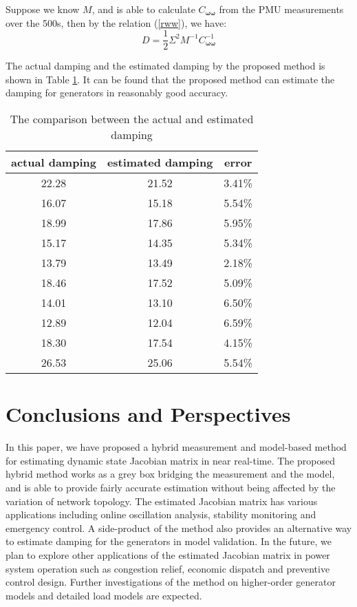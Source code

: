 \documentclass[journal]{IEEEtran}
\begin{document}
Suppose we know $M$, and is able to calculate $C_{\bm{\omega}{\bm{\omega}}}$ from the PMU measurements over the 500s, then by the relation (\ref{rww}), we have:
\begin{equation}
D=\frac{1}{2}\Sigma^2M^{-1}C_{\bm{\omega}{\bm{\omega}}}^{-1} \label{D}
\end{equation}

The actual damping and the estimated damping by the proposed method is shown in Table \ref{39-dampingtable}. It can be found that the proposed method can estimate the damping for generators in reasonably good accuracy.
\begin{table}[!ht]
\centering
\caption{The comparison between the actual and estimated damping}\label{39-dampingtable}
\begin{tabular}{|c|c|c|}
\hline
actual damping&estimated damping&error\\
\hline
22.28&21.52&3.41\%\\
\hline
16.07&15.18&5.54\%\\
\hline
18.99&17.86&5.95\%\\
\hline
15.17&14.35&5.34\%\\
\hline
13.79&13.49&2.18\%\\
\hline
18.46&17.52&5.09\%\\
\hline
14.01&13.10&6.50\%\\
\hline
12.89&12.04&6.59\%\\
\hline
18.30&17.54&4.15\%\\
\hline
26.53&25.06&5.54\%\\
\hline
\end{tabular}
\end{table}


\section{Conclusions and Perspectives}\label{sectionconclusion}

In this paper, we have proposed a hybrid measurement and model-based method for estimating dynamic state Jacobian matrix in near real-time. The proposed hybrid method works as a grey box bridging the measurement and the model, and is able to provide fairly accurate estimation without being affected by the variation of network topology. The estimated Jacobian matrix has various applications including online oscillation analysis, stability monitoring and emergency control. A side-product of the method also provides an alternative way to estimate damping for the generators in model validation. In the future, we plan to explore other applications of the estimated Jacobian matrix in power system operation such as congestion relief, economic dispatch and preventive control design. Further investigations of the method on higher-order generator models and detailed load models are expected. 
\appendices
\end{document}
